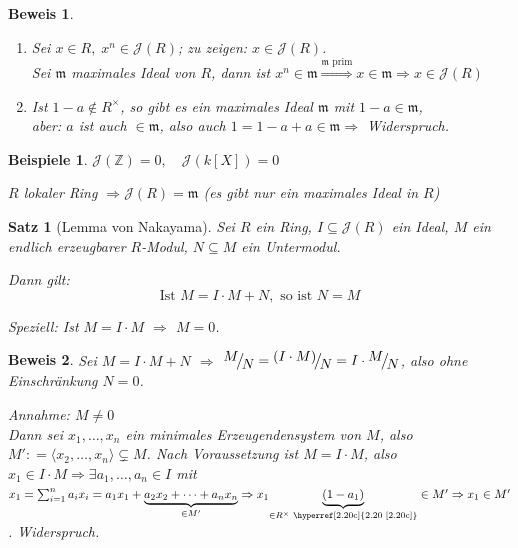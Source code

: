 \documentclass[a4paper,12pt]{scrbook}
\theoremstyle{break}
\newtheorem{Satz}{Satz}
\theoremstyle{nonumberbreak}
\newtheorem{Bew}{Beweis}
\newtheorem{nnBsp}{Beispiele}
\theoremstyle{nonumberplain}
\newcommand{\defeqr}[0]{\mathrel{\mathop:}=}
\newcommand{\myref}[2]{%
\hyperref[#2]{#1~\ref*{#2}}%
}
\newcommand{\FakRaum}[2]{
  \raisebox{0.7ex}{\ensuremath{#1}}
  \ensuremath{\mkern-3mu}\big/\ensuremath{\mkern-3mu}
  \raisebox{-0.6ex}{\ensuremath{#2}}}
\begin{document}
\begin{Bew}

\begin{enumerate}
\item Sei $x \in R, \; x^n \in \mathcal{J}(R)$; zu zeigen: $x \in \mathcal{J}(R)$.\\
  Sei $\mathfrak{m}$ maximales Ideal von $R$, dann ist $x^n \in \mathfrak{m} \overset{\mathfrak{m} \text{ prim}}{\Rightarrow} x \in \mathfrak{m} \Rightarrow x \in \mathcal{J}(R)$
\item Ist $1-a \notin R^{\times}$, so gibt es ein maximales Ideal $\mathfrak{m}$ mit $1-a \in \mathfrak{m}$,\\
aber: $a$ ist auch $\in \mathfrak{m}$, also auch $1 = 1-a+a \in \mathfrak{m} \Rightarrow$ Widerspruch.
\end{enumerate}
  
\end{Bew}

\begin{nnBsp}
  $\mathcal{J}(\mathbb{Z}) = 0, \quad \mathcal{J}(k[X]) = 0$

  $R$ lokaler Ring $\Rightarrow \mathcal{J}(R) = \mathfrak{m}$ (es gibt nur ein maximales Ideal in $R$)
\end{nnBsp}

\begin{Satz}[Lemma von Nakayama]
\label{Satz8}
Sei $R$ ein Ring, $I \subseteq \mathcal{J}(R)$ ein Ideal, $M$ ein endlich erzeugbarer $R$-Modul, $N \subseteq M$ ein Untermodul.

Dann gilt:
$$\text{Ist }M = I \cdot M + N, \text{ so ist }N = M$$

Speziell: Ist $M = I \cdot M$ $\Rightarrow$ $M=0$.
\end{Satz}

\begin{Bew}
  Sei $M=I \cdot M + N$ $\Rightarrow$ $\FakRaum{M}{N} = \FakRaum{(I \cdot M)}{N} = I \cdot \FakRaum{M}{N}$, also ohne Einschränkung $N=0$.

  Annahme: $M \not= 0$\\
  Dann sei $x_1, \dots, x_n$ ein minimales Erzeugendensystem von $M$, also $M' \defeqr \langle x_2, \dots, x_n\rangle \subsetneq M$.
  Nach Voraussetzung ist $M = I \cdot M$, also $x_1 \in I \cdot M \Rightarrow \exists a_1, \dots, a_n \in I$ mit $x_1 = \sum_{i=1}^n a_i x_i = a_1 x_1 + \underset{\in M'}{\underbrace{a_2 x_2 + \dots + a_n x_n}} \Rightarrow x_1\underset{\in R^{\times} \text{ \myref{2.20}{2.20c}}}{\underbrace{(1-a_1)}} \in M' \Rightarrow x_1 \in M'$. Widerspruch.
\end{Bew}
\end{document}
